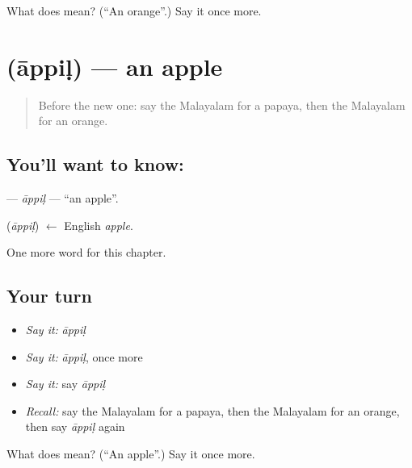 \begin{tcolorbox}[breakable,colback=teal!4,colframe=teal!35!black,title={Before you move on}]
What does  mean? (\textquotedblleft{}An orange\textquotedblright{}.) Say it once more.
\end{tcolorbox}
\section[\texorpdfstring{\ml{ആപ്പിൾ} (āppiḷ)}{ആപ്പിൾ (āppiḷ)}]{ (āppiḷ) — an apple}

\label{lesson:ML-C287-appil}



\begin{quote}
Before the new one: say the Malayalam for a papaya, then the Malayalam for an orange.
\end{quote}

\subsection*{You'll want to know: }
\textbf{} — \emph{āppiḷ} — \textquotedblleft{}an apple\textquotedblright{}.

\begin{cousinweb}
\textbf{} (\emph{āppiḷ}) $\leftarrow$ English \emph{apple}.
\end{cousinweb}

\begin{grammarlens}[title={What you've built}]
One more word for this chapter.
\end{grammarlens}

\subsection*{Your turn}
\begin{itemize}
\raggedright
  \item \emph{Say it:} \emph{āppiḷ}
  \item \emph{Say it:} \emph{āppiḷ}, once more
  \item \emph{Say it:} say \emph{āppiḷ}
  \item \emph{Recall:} say the Malayalam for a papaya, then the Malayalam for an orange, then say \emph{āppiḷ} again
\end{itemize}

\begin{tcolorbox}[breakable,colback=teal!4,colframe=teal!35!black,title={Before you move on}]
What does  mean? (\textquotedblleft{}An apple\textquotedblright{}.) Say it once more.
\end{tcolorbox}
